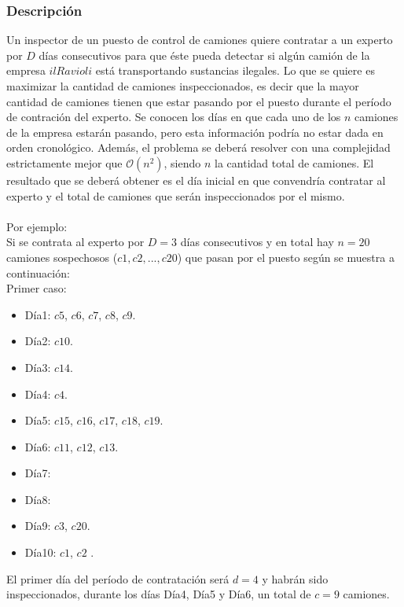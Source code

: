 \documentclass[11pt, a4paper, twoside]{article}
\begin{document}
{}

\subsubsection{Descripción}
Un inspector de un puesto de control de camiones quiere contratar a un experto por $D$ d\'ias consecutivos para que \'este pueda detectar si alg\'un cami\'on de la empresa $il Ravioli$ est\'a transportando sustancias ilegales. Lo que se quiere es maximizar la cantidad de camiones inspeccionados, es decir que la mayor cantidad de camiones tienen que estar pasando por el puesto durante el per\'iodo de contraci\'on del experto. Se conocen los d\'ias en que cada uno de los $n$ camiones de la empresa estar\'an pasando, pero esta informaci\'on podr\'ia no estar dada en orden cronol\'ogico. Adem\'as, el problema se deber\'a resolver con una complejidad estrictamente mejor que $\mathcal{O}(n^{2})$, siendo $n$ la cantidad total de camiones. El resultado que se deber\'a obtener es el d\'ia inicial en que convendr\'ia contratar al experto y el total de camiones que ser\'an inspeccionados por el mismo.\\
\\
Por ejemplo: 
\\
Si se contrata al experto por $D=3$ d\'ias consecutivos y en total hay $n=20$ camiones sospechosos ($c1,c2,...,c20$) que pasan por el puesto seg\'un se muestra a continuaci\'on: \\

Primer caso: 

\begin{itemize}
\item D\'ia1: $c5$, $c6$, $c7$, $c8$, $c9$. 
\item D\'ia2: $c10$. 
\item D\'ia3: $c14$.
\item D\'ia4: $c4$.
\item D\'ia5: $c15$, $c16$, $c17$, $c18$, $c19$. 
\item D\'ia6: $c11$, $c12$, $c13$.
\item D\'ia7: 
\item D\'ia8: 
\item D\'ia9: $c3$, $c20$.
\item D\'ia10: $c1$, $c2$ .
\end{itemize}  

El primer d\'ia del per\'iodo de contrataci\'on ser\'a $d=4$ y habr\'an sido inspeccionados, durante los d\'ias D\'ia4, D\'ia5 y D\'ia6, un total de $c=9$ camiones. \\
\end{document}
